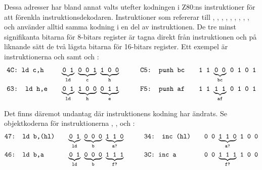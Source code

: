 \documentclass[main.tex]{subfiles}
\begin{document}
Dessa adresser har bland annat valts utefter kodningen i Z80:ns instruktioner
för att förenkla instruktionsdekodaren. Instruktioner som refererar till
, , , , , , ,
, ,  och  använder alltid samma kodning i
en del av instruktionen. De tre minst signifikanta bitarna för 8-bitars
register är tagna direkt från instruktionen och på liknande sätt de två lägsta
bitarna för 16-bitars register. Ett exempel är instruktionerna 
och  samt  och :
\begin{align*}
    &\texttt{4C: ld c,h}& \quad &
    {\underbrace{\texttt{0 1}}_{\texttt{ld}}}\texttt{ }
    {\underbrace{\texttt{0 0 1}}_{\texttt{c}}}\texttt{ }
    {\underbrace{\texttt{1 0 0}}_{\texttt{h}}}
    \qquad
    &\texttt{C5: push bc}& \quad &
    \texttt{1 1 }
    {\underbrace{\texttt{0 0}}_{\texttt{bc}}}\texttt{ }
    \texttt{0 1 0 1}
    \\
    &\texttt{63: ld h,e} &&
    {\underbrace{\texttt{0 1}}_{\texttt{ld}}}\texttt{ }
    {\underbrace{\texttt{1 0 0}}_{\texttt{h}}}\texttt{ }
    {\underbrace{\texttt{0 1 1}}_{\texttt{e}}}
    &\texttt{F5: push af} &&
    \texttt{1 1 }
    {\underbrace{\texttt{1 1}}_{\texttt{af}}}\texttt{ }
    \texttt{0 1 0 1}
\end{align*}

Det finns däremot undantag där instruktionens kodning har ändrats. Se
objektkoderna för instruktionerna , ,  och :
\begin{align*}
    &\texttt{47: ld b,(hl)}& \quad &
    {\underbrace{\texttt{0 1}}_{\texttt{ld}}}\texttt{ }
    {\underbrace{\texttt{0 0 0}}_{\texttt{b}}}\texttt{ }
    {\underbrace{\texttt{1 1 0}}_{\texttt{a?}}}
    \qquad
    &&\texttt{34: inc (hl)} &\quad &
    \texttt{0 0 }
    {\underbrace{\texttt{1 1 0}}_{\texttt{a?}}}\texttt{ }
    \texttt{1 0 0}
    \\
    &\texttt{46: ld b,a} &&
    {\underbrace{\texttt{0 1}}_{\texttt{ld}}}\texttt{ }
    {\underbrace{\texttt{0 0 0}}_{\texttt{b}}}\texttt{ }
    {\underbrace{\texttt{1 1 1}}_{\texttt{f?}}}
    &&\texttt{3C: inc a} &&
    \texttt{0 0 }
    {\underbrace{\texttt{1 1 1}}_{\texttt{f?}}}\texttt{ }
    \texttt{1 0 0}
\end{align*}
\end{document}
